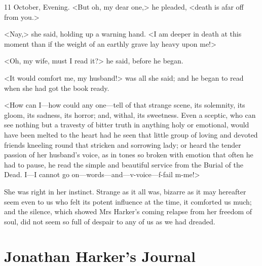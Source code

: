 \begin{diary}{11 October, Evening.}
<But oh, my dear one,> he pleaded, <death is afar off from you.>

<Nay,> she said, holding up a warning hand. <I am deeper in death at this moment than if the weight of an earthly grave lay heavy upon me!>

<Oh, my wife, must I read it?> he said, before he began.

<It would comfort me, my husband!> was all she said; and he began to read when she had got the book ready.

<How can I—how could any one—tell of that strange scene, its solemnity, its gloom, its sadness, its horror; and, withal, its sweetness. Even a sceptic, who can see nothing but a travesty of bitter truth in anything holy or emotional, would have been melted to the heart had he seen that little group of loving and devoted friends kneeling round that stricken and sorrowing lady; or heard the tender passion of her husband's voice, as in tones so broken with emotion that often he had to pause, he read the simple and beautiful service from the Burial of the Dead. I—I cannot go on—words—and—v-voice—f-fail m-me!>

 

She was right in her instinct. Strange as it all was, bizarre as it may hereafter seem even to us who felt its potent influence at the time, it comforted us much; and the silence, which showed Mrs Harker's coming relapse from her freedom of soul, did not seem so full of despair to any of us as we had dreaded.
\end{diary}

\section{Jonathan Harker's Journal}

